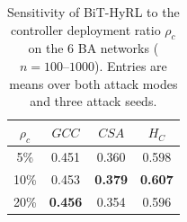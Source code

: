 \begin{table}[!htbp]
\centering
\caption{Sensitivity of BiT-HyRL to the controller deployment ratio $\rho_c$ on the 6 BA networks ($n=100$--$1000$). Entries are means over both attack modes and three attack seeds.}
\label{tab:sensitivity_ratio}
\begin{tabular}{@{}cccc@{}}
\toprule
\textbf{$\rho_c$} & \textbf{$GCC$} & \textbf{$CSA$} & \textbf{$H_C$} \\
\midrule
5\% & 0.451 & 0.360 & 0.598 \\
10\% & 0.453 & \textbf{0.379} & \textbf{0.607} \\
20\% & \textbf{0.456} & 0.354 & 0.596 \\
\bottomrule
\end{tabular}
\end{table}

